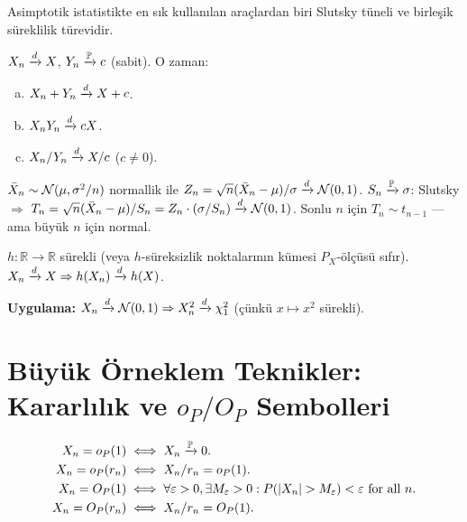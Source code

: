 Asimptotik istatistikte en sık kullanılan araçlardan biri Slutsky tüneli ve birleşik süreklilik türevidir.

\begin{teorem}\label{app:thm:slutsky}
$X_n\xrightarrow{d} X$, $Y_n\xrightarrow{\mathbb{P}} c$ (sabit). O zaman:
\begin{enumerate}[(a)]
  \item $X_n+Y_n\xrightarrow{d} X+c$.
  \item $X_nY_n\xrightarrow{d} cX$.
  \item $X_n/Y_n\xrightarrow{d} X/c$ ($c\neq0$).
\end{enumerate}
\end{teorem}

\begin{ornek}\label{app:ex:t_slutsky}
$\bar X_n\sim\mathcal{N}(\mu,\sigma^2/n)$ normallik ile $Z_n=\sqrt{n}(\bar X_n-\mu)/\sigma\xrightarrow{d}\mathcal{N}(0,1)$.
$S_n\xrightarrow{\mathbb{P}}\sigma$: Slutsky $\Rightarrow$ $T_n=\sqrt{n}(\bar X_n-\mu)/S_n=Z_n\cdot(\sigma/S_n)\xrightarrow{d}\mathcal{N}(0,1)$.
Sonlu $n$ için $T_n\sim t_{n-1}$ --- ama büyük $n$ için normal.
\end{ornek}

\begin{teorem}\label{app:thm:cont_mapping}
$h:\mathbb{R}\to\mathbb{R}$ sürekli (veya $h$-süreksizlik noktalarının kümesi $P_X$-ölçüsü sıfır). $X_n\xrightarrow{d} X\Rightarrow h(X_n)\xrightarrow{d} h(X)$.
\end{teorem}

\noindent\textbf{Uygulama:} $X_n\xrightarrow{d}\mathcal{N}(0,1)\Rightarrow X_n^2\xrightarrow{d}\chi^2_1$ (çünkü $x\mapsto x^2$ sürekli).

\section{Büyük Örneklem Teknikler: Kararlılık ve $o_P / O_P$ Sembolleri}
\label{app:op_sembolleri}

\begin{tanim}[$o_P$ ve $O_P$]\label{app:def:op}
\begin{align*}
  X_n = o_P(1) &\iff X_n\pto0.\\
  X_n = o_P(r_n) &\iff X_n/r_n = o_P(1).\\
  X_n = O_P(1) &\iff \forall\varepsilon>0,\exists M_\varepsilon>0: P(|X_n|>M_\varepsilon)<\varepsilon \text{ for all }n.\\
  X_n = O_P(r_n) &\iff X_n/r_n = O_P(1).
\end{align*}
\end{tanim}

